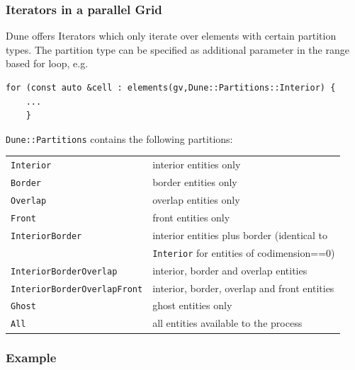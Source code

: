 \documentclass[aspectratio=169,11pt]{beamer}
\theoremstyle{definition}
\begin{document}
\begin{frame}[fragile]
  \frametitle<presentation>{Iterators in a parallel Grid}
  \small
  Dune offers Iterators which only iterate over elements with certain partition types. The partition type can be specified as additional parameter in the range based for loop, e.g.
\begin{lstlisting}[breaklines=true,basicstyle=\ttfamily\footnotesize]
    for (const auto &cell : elements(gv,Dune::Partitions::Interior) {
    ...
    }
\end{lstlisting}

\lstinline!Dune::Partitions! contains the following partitions:\smallskip\\

    \begin{tabular}{ll}
      \lstinline!Interior! & interior entities only\\
      \lstinline!Border! & border entities only\\
      \lstinline!Overlap! & overlap entities only\\
      \lstinline!Front! & front entities only\\
      \lstinline!InteriorBorder! & interior entities plus border (identical to \\
     & \lstinline!Interior! for entities of  codimension==0)\\
      \lstinline!InteriorBorderOverlap! & interior, border and overlap entities\\
      \lstinline!InteriorBorderOverlapFront! & interior, border, overlap and front entities \\
      \lstinline!Ghost! & ghost entities only\\
      \lstinline!All! & all entities available to the process
    \end{tabular}
\end{frame}

\begin{frame}
  \frametitle{Example}
  
\end{frame}
\end{document}
